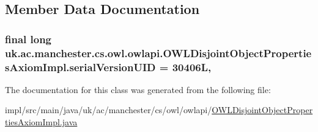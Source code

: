 \subsection{Member Data Documentation}
\hypertarget{classuk_1_1ac_1_1manchester_1_1cs_1_1owl_1_1owlapi_1_1_o_w_l_disjoint_object_properties_axiom_impl_ab8707a4250068ac50b74b81e918ecf34}{
\subsubsection[{serial\-Version\-U\-I\-D}]{\setlength{\rightskip}{0pt plus 5cm}final long uk.\-ac.\-manchester.\-cs.\-owl.\-owlapi.\-O\-W\-L\-Disjoint\-Object\-Properties\-Axiom\-Impl.\-serial\-Version\-U\-I\-D = 30406\-L\hspace{0.3cm}{\ttfamily [static]}, {\ttfamily [private]}}}\label{classuk_1_1ac_1_1manchester_1_1cs_1_1owl_1_1owlapi_1_1_o_w_l_disjoint_object_properties_axiom_impl_ab8707a4250068ac50b74b81e918ecf34}


The documentation for this class was generated from the following file\-:\begin{DoxyCompactItemize}
\item 
impl/src/main/java/uk/ac/manchester/cs/owl/owlapi/\hyperlink{_o_w_l_disjoint_object_properties_axiom_impl_8java}{O\-W\-L\-Disjoint\-Object\-Properties\-Axiom\-Impl.\-java}\end{DoxyCompactItemize}
